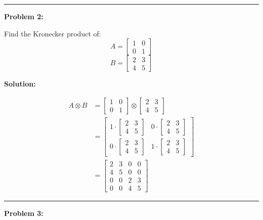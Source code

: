 \documentclass[
  letterpaper,
  DIV=11,
  numbers=noendperiod]{scrreprt}
\theoremstyle{plain}
\theoremstyle{definition}
\theoremstyle{remark}
\begin{document}
\begin{center}\rule{0.5\linewidth}{0.5pt}\end{center}

\textbf{Problem 2:}

Find the Kronecker product of:
\[A=\begin{bmatrix}1&0\\0&1\end{bmatrix}\]
\[B=\begin{bmatrix}2&3\\4&5\end{bmatrix}\]

\textbf{Solution:}

\begin{align*}
A \otimes B &= \begin{bmatrix}1&0\\0&1\end{bmatrix} \otimes \begin{bmatrix}2&3\\4&5\end{bmatrix} \\
&= \begin{bmatrix}
1 \cdot \begin{bmatrix}2&3\\4&5\end{bmatrix} & 0 \cdot \begin{bmatrix}2&3\\4&5\end{bmatrix} \\
0 \cdot \begin{bmatrix}2&3\\4&5\end{bmatrix} & 1 \cdot \begin{bmatrix}2&3\\4&5\end{bmatrix}
\end{bmatrix} \\
&= \begin{bmatrix}
2 & 3 & 0 & 0 \\
4 & 5 & 0 & 0 \\
0 & 0 & 2 & 3 \\
0 & 0 & 4 & 5
\end{bmatrix}
\end{align*}

\begin{center}\rule{0.5\linewidth}{0.5pt}\end{center}

\textbf{Problem 3:}
\end{document}

